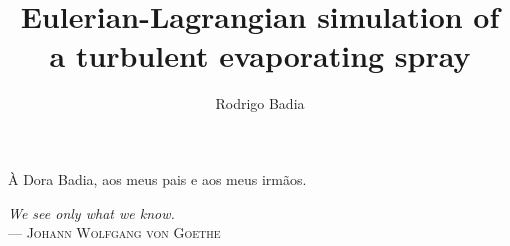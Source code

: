 \documentclass[msc,eng]{ita}    %
\author{Rodrigo Badia}{Piccinini}
\title{Eulerian-Lagrangian simulation of a turbulent evaporating spray}
\date{}{2011}
\begin{document}
\newcommand{\bv}[1]{\mathbf{#1}} 
\newcommand{\req}[1]{#1^{*}} 

\newenvironment{remark}[1][Remark.]{\begin{trivlist}
\item[\hskip \labelsep {\bfseries #1}]}{\end{trivlist}}

\newenvironment{notation}[1][Notation.]{\begin{trivlist}
\item[\hskip \labelsep {\bfseries #1}]}{\end{trivlist}}

\maketitle

\begin{itadedication}
\`{A} Dora Badia, aos meus pais e aos meus irm\~{a}os.
\end{itadedication}

\begin{itathanks}

\end{itathanks}
% 
\thispagestyle{empty}
\ifhyperref{}\fi
\begin{flushright}
\begin{spacing}{1}
\mbox{}\vfill
{\sffamily\itshape
We see only what we know.
\\}
--- \textsc{Johann Wolfgang von Goethe}
\end{spacing}
\end{flushright}

\begin{abstract}

\end{abstract}

\begin{englishabstract}

\end{englishabstract}

\tableofcontents
\listoffigures
\listoftables
% 
\listofsymbols


\mainmatter
\end{document}
